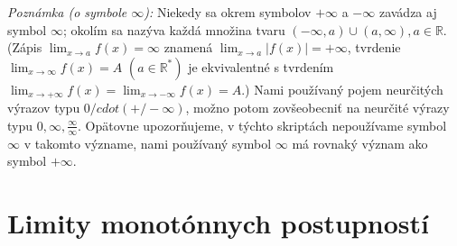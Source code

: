 \textit{Poznámka (o symbole $\infty$):}
Niekedy sa okrem symbolov $+\infty$ a $-\infty$ zavádza aj symbol $\infty$; okolím sa nazýva každá množina tvaru $(-\infty,a)\cup (a,\infty), a \in \mathbb{R}$. (Zápis $\lim_{x \rightarrow a}f(x)=\infty$ znamená $\lim_{x \rightarrow a}|f(x)|=+\infty$, tvrdenie $\lim_{x \rightarrow \infty} f(x)=A$   $(a \in \mathbb{R^*})$ je ekvivalentné s tvrdením $\lim_{x \rightarrow +\infty}f(x)=\lim_{x \rightarrow -\infty}f(x)=A$.) Nami používaný pojem neurčitých výrazov typu $0 /cdot (+/- \infty)$, možno potom zovšeobecniť na neurčité výrazy typu $0, \infty, \frac{\infty}{\infty}$. Opätovne upozorňujeme, v týchto skriptách nepoužívame symbol $\infty$ v takomto význame, nami používaný symbol $\infty$ má rovnaký význam ako symbol $+\infty$.

\section{Limity monotónnych postupností}